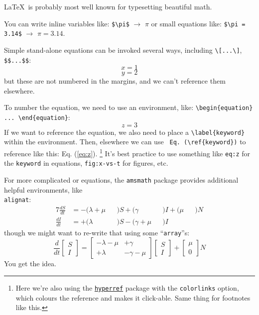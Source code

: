 \LaTeX\ is probably most well known for typesetting beautiful math.
\par
You can write inline variables like: \lstinline|$\pi$| $\rightarrow$ $\pi$
or small equations like: \lstinline|$\pi = 3.14$| $\rightarrow$ $\pi = 3.14$.
\par
Simple stand-alone equations can be invoked several ways, including \lstinline|\[...\]|, \lstinline|$$...$$|:
\[ x = 1 \]
$$ y = 2 $$
but these are not numbered in the margins, and we can't reference them elsewhere.
\par
To number the equation, we need to use an environment, like: \lstinline|\begin{equation} ... \end{equation}|:
\begin{equation}
z = 3
\label{eq:z}
\end{equation}
If we want to reference the equation, we also need to place a \lstinline|\label{keyword}| within the environment.
Then, elsewhere we can use \lstinline| Eq. (\ref{keyword})| to reference like this: Eq. (\ref{eq:z}).%
\footnote{Here we're also using
  the \href{https://ctan.org/pkg/hyperref}{\texttt{hyperref}} package
  with the \lstinline|colorlinks| option,
  which colours the reference and makes it click-able.
  Same thing for footnotes like this.}
It's best practice to use something like \lstinline|eq:z| for the \lstinline|keyword| in equations, \lstinline|fig:x-vs-t| for figures, etc.
\par
For more complicated or equations, the \lstinline|amsmath| package provides additional helpful environments, like\\
\lstinline|alignat|:
\begin{alignat}{7}
\frac{dS}{dt} &= - (\lambda+\mu &&)S + (\gamma     &&)I + (\mu &&)N\\
\frac{dI}{dt} &= + (\lambda     &&)S - (\gamma+\mu &&)I
\end{alignat}
though we might want to re-write that using some ``\lstinline|array|''s:
\begin{equation}
\frac{d}{dt}
\left[ \begin{array}{c} S \\ I \end{array} \right] =
\left[ \begin{array}{cc} -\lambda-\mu & +\gamma \\ +\lambda & -\gamma-\mu \end{array} \right]
\left[ \begin{array}{c} S \\ I \end{array} \right] +
\left[ \begin{array}{c} \mu \\ 0 \end{array} \right] N
\end{equation}
You get the idea.
